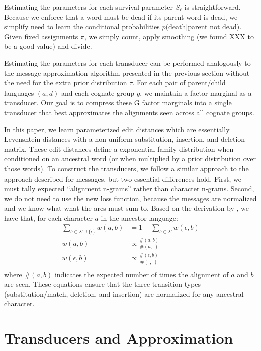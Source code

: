 \documentclass[11pt,a4paper]{article}
\begin{document}
Estimating the parameters for each survival parameter $S_\ell$ is
straightforward. Because we enforce that a word must be dead if
its parent word is dead, we simplify need to learn the conditional
probabilities $p($death$|$parent not dead$)$. Given fixed assignments
$\pi$, we simply count, apply smoothing (we found XXX to be a good
value) and divide.

Estimating the parameters for each transducer can be performed
analogously to the message approximation algorithm presented in the
previous section without the need for the extra prior distribution
$\tau$. For each pair of parent/child languages $(a,d)$ and each
cognate group $g$, we maintain a factor marginal as a transducer.
Our goal is to compress these G factor marginals into a single
transducer that best approximates the alignments seen across all
cognate groups.

In this paper, we learn parameterized edit distances which are
essentially Levenshtein distances with a non-uniform substitution,
insertion, and deletion matrix. These edit distances define a
exponential family distribution when conditioned on an ancestral
word (or when multiplied by a prior distribution over those words).
To construct the transducers, we follow a similar approach to the
approach described for messages, but two essential differences hold.
First, we must tally expected ``alignment n-grams'' rather than
character n-grams. Second, we do not need to use the new loss
function, because the messages are normalized and we know what what
the arcs must sum to. Based on the derivation by 
, we have that, for each character $a$ in the ancestor language:
\begin{equation}
  \begin{split}
    \sum_{b \in \Sigma \cup \{\epsilon\}} w(a,b) &= 1 - \sum_{b \in \Sigma} w(\epsilon,b) \\
    w(a,b) &\propto \frac{\#(a,b)}{\#(a,\cdot)} \\
    w(\epsilon,b) &\propto \frac{\#(\epsilon,b)}{\#(\cdot,\cdot)} \\
   \end{split}
 \end{equation}
where $\#(a,b)$ indicates the expected number of times the alignment
of $a$ and $b$ are seen. These equations ensure that the three transition
types (substitution/match, deletion, and insertion) are normalized for
any ancestral character.



\section{Transducers and Approximation}
\end{document}

